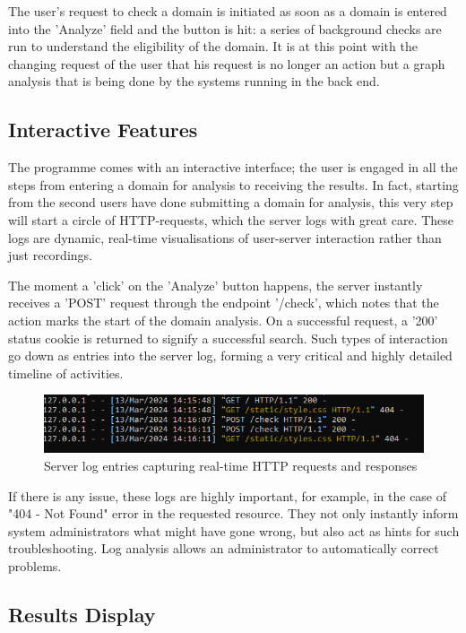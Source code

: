 The user's request to check a domain is initiated as soon as a domain is entered into the 'Analyze' field and the button is hit: a series of background checks are run to understand the eligibility of the domain. It is at this point with the changing request of the user that his request is no longer an action but a graph analysis that is being done by the systems running in the back end.

\subsection{Interactive Features}

The programme comes with an interactive interface; the user is engaged in all the steps from entering a domain for analysis to receiving the results. In fact, starting from the second users have done submitting a domain for analysis, this very step will start a circle of HTTP-requests, which the server logs with great care. These logs are dynamic, real-time visualisations of user-server interaction rather than just recordings.


The moment a 'click' on the 'Analyze' button happens, the server instantly receives a 'POST' request through the endpoint '/check', which notes that the action marks the start of the domain analysis. On a successful request, a '200' status cookie is returned to signify a successful search. Such types of interaction go down as entries into the server log, forming a very critical and highly detailed timeline of activities.
\begin{figure}[H]
    \centering
    \includegraphics[width=0.8\linewidth]{project/I.png}
    \caption{Server log entries capturing real-time HTTP requests and responses}
    \label{fig:imple22222}
\end{figure}

If there is any issue, these logs are highly important, for example, in the case of "404 - Not Found" error in the requested resource. They not only instantly inform system administrators what might have gone wrong, but also act as hints for such troubleshooting. Log analysis allows an administrator to automatically correct problems.

\subsection{Results Display}

